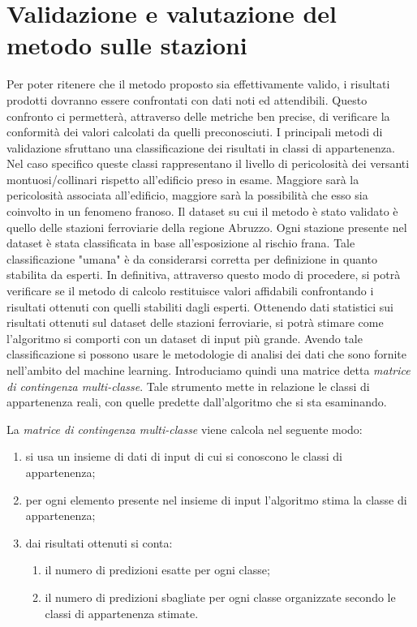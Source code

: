
\chapter{Validazione e valutazione del metodo sulle stazioni} \label{ch:validazione_stazioni}
Per poter ritenere che il metodo proposto sia effettivamente valido, i risultati prodotti dovranno essere confrontati con dati noti ed attendibili. Questo confronto ci permetterà, attraverso delle metriche ben precise, di verificare la conformità dei valori calcolati da quelli preconosciuti.
I principali metodi di validazione sfruttano una classificazione dei risultati in classi di appartenenza. Nel caso specifico queste classi rappresentano il livello di pericolosità dei versanti montuosi/collinari rispetto all'edificio preso in esame.
Maggiore sarà la pericolosità associata all'edificio, maggiore sarà la possibilità che esso sia coinvolto in un fenomeno franoso.
Il dataset su cui il metodo è stato validato è quello delle stazioni ferroviarie della regione Abruzzo.
Ogni stazione presente nel dataset è stata classificata in base all'esposizione al rischio frana. Tale classificazione "umana" è da considerarsi corretta per definizione in quanto stabilita da esperti. In definitiva, attraverso questo modo di procedere, si potrà verificare se il metodo di calcolo restituisce valori affidabili confrontando i risultati ottenuti con quelli stabiliti dagli esperti. Ottenendo dati statistici sui risultati ottenuti sul dataset delle stazioni ferroviarie, si potrà stimare come l'algoritmo si comporti con un dataset di input più grande. 
Avendo tale classificazione si possono usare le metodologie di analisi dei dati che sono fornite nell'ambito del machine learning. Introduciamo quindi una matrice detta \textit{matrice di contingenza multi-classe}. Tale strumento mette in relazione le classi di appartenenza reali, con quelle predette dall'algoritmo che si sta esaminando.


La \textit{matrice di contingenza multi-classe} viene calcola nel seguente modo:
\begin{enumerate}
	\item si usa un insieme di dati di input di cui si conoscono le classi di appartenenza;
	\item per ogni elemento presente nel insieme di input l'algoritmo stima la classe di appartenenza;
	\item dai risultati ottenuti si conta:
	\begin{enumerate}
		\item il numero di predizioni esatte per ogni classe;
		\item il numero di predizioni sbagliate per ogni classe organizzate secondo le classi di appartenenza stimate.
	\end{enumerate}
\end{enumerate}



